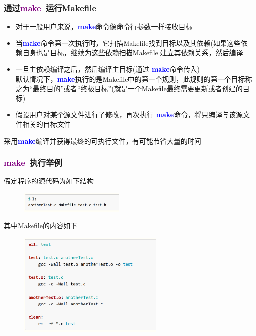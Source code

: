 \frame
{
	\frametitle{通过\textcolor{purple}{\textbf{make}}~运行\textrm{Makefile}}
	\begin{itemize}
		\item 对于一般用户来说，\textcolor{blue}{\textbf{make}}命令像命令行参数一样接收目标
		\item 当\textcolor{blue}{\textbf{make}}命令第一次执行时，它扫描\textrm{Makefile}找到目标以及其依赖(如果这些依赖自身也是目标，继续为这些依赖扫描\textrm{Makefile} 建立其依赖关系，然后编译
		\item 一旦主依赖编译之后，然后编译主目标(通过 \textcolor{blue}{\textbf{make}}命令传入)\\
			默认情况下，\textcolor{blue}{\textbf{make}}执行的是\textrm{Makefile}中的第一个规则，此规则的第一个目标称之为“最终目的”或者“终极目标”(就是一个\textrm{Makefile}最终需要更新或者创建的目标)
		\item 假设用户对某个源文件进行了修改，再次执行 \textcolor{blue}{\textbf{make}}命令，将只编译与该源文件相关的目标文件
	\end{itemize}
	采用\textcolor{blue}{\textbf{make}}编译并获得最终的可执行文件，有可能节省大量的时间
}

\frame
{
	\frametitle{\textcolor{purple}{\textbf{make}}~执行举例}
	假定程序的源代码为如下结构
\begin{figure}[h!]
	\vskip -3pt
\centering
\includegraphics[height=0.4in,clip]{Figures/Make_Makefile_1.png}
\label{Fig:Make_Makefile_1}
\end{figure}
其中\textrm{Makefile}的内容如下
\begin{figure}[h!]
	\vskip -4pt
\centering
\includegraphics[height=2.0in,clip]{Figures/Make_Makefile_2.png}
\label{Fig:Make_Makefile_2}
\end{figure}
}

